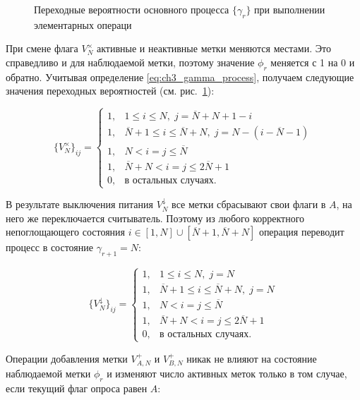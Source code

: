 \begin{figure}[htb]
  \caption{Переходные вероятности основного процесса $\{\gamma_r\}$ при выполнении элементарных операци}
  \label{fig:ch3_fg_trans}
\end{figure}

При смене флага $V_N^\times$ активные и неактивные метки меняются местами. Это справедливо и для наблюдаемой метки, поэтому значение $\phi_r$ меняется с 1 на 0 и обратно. Учитывая определение \eqref{eq:ch3_gamma_process}, получаем следующие значения переходных вероятностей (см. рис.~\ref{fig:ch3_fg_trans}):

\begin{equation}\label{eq:ch3_fg_switch}
	\{ V_N^\times \}_{ij} = \begin{cases}
 		1, & 1 \leqslant i \leqslant N, \; j = \overline{N} + N + 1 - i\\
 		1, & \overline{N} + 1 \leqslant i \leqslant \overline{N} + N,\; j = N - (i - \overline{N} - 1)\\
 		1, & N < i = j \leqslant \overline{N}\\
 		1, & \overline{N} + N < i = j \leqslant 2\overline{N} + 1\\
 		0, & \text{в остальных случаях.}
 	\end{cases}
\end{equation}

В результате выключения питания $V_N^\downarrow$ все метки сбрасывают свои флаги в $A$, на него же переключается считыватель. Поэтому из любого корректного непоглощающего состояния $i \in [1, N] \cup [\overline{N}+1, \overline{N} + N]$ операция переводит процесс в состояние $\gamma_{r+1} = N$:

\begin{equation}\label{eq:ch3_fg_power_off}
	\{ V_N^\downarrow \}_{ij} = \begin{cases}
 		1, & 1 \leqslant i \leqslant N,\; j = N\\
 		1, & \overline{N}+1 \leqslant i \leqslant \overline{N} + N,\; j = N\\
 		1, & N < i = j \leqslant \overline{N}\\
 		1, & \overline{N} + N < i = j \leqslant 2\overline{N} + 1\\
 		0, & \text{в остальных случаях}.
 	\end{cases}
\end{equation}

Операции добавления метки $V_{A,N}^+$ и $V_{B,N}^+$ никак не влияют на состояние наблюдаемой метки $\phi_r$ и изменяют число активных меток только в том случае, если текущий флаг опроса равен $A$:


